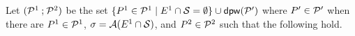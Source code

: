 \begin{definition}
  \label{def:semi:seq}
  






  

  Let $(\mathcal{P}^1 \mathbin; \mathcal{P}^2)$ be the set
  $\{P^1\in\mathcal{P}^1\mid E^1\cap\mathcal{S}=\emptyset\}\cup \mathsf{dpw}(\mathcal{P}')$
  where $P'\in\mathcal{P}'$ when there are $P^1 \in \mathcal{P}^1$,
  $\sigma=\mathcal{A}(E^1\cap\mathcal{S})$, 
  and $P^2\in\mathcal{P}^2$
  such that the following hold.


\end{definition}
